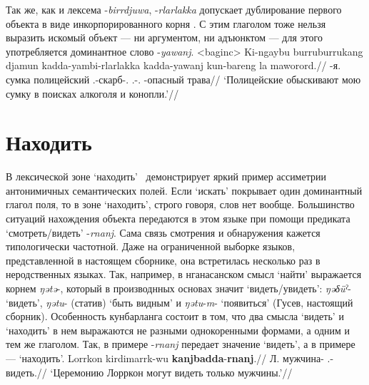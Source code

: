 Так же, как и лексема -\textit{birrdjuwa}, -\textit{rlarlakka} допускает дублирование первого объекта в виде инкорпорированного корня . С этим глаголом тоже нельзя выразить искомый объект --- ни аргументом, ни адъюнктом --- для этого употребляется доминантное слово -\textit{yawanj}.
\ex<baginc>\begingl
\gla Ki-ngaybu burruburrukang djamun kadda-yambi-rlarlakka kadda-yawanj kun-bareng la maworord.//
\glb \ki-я.\Gen{} сумка полицейский \Tpl.\Real-скарб-\rlk.\Np{} \Tpl.\Real-\yaw.\Np{} \Cliv-опасный \la{} трава//
\glft `Полицейские обыскивают мою сумку в поисках алкоголя и конопли.'//%
\endgl\xe


\section{Находить}
\label{sec:find}
В лексической зоне `находить' \ демонстрирует яркий пример ассиметрии антонимичных семантических полей. Если `искать' покрывает один доминантный глагол поля, то в зоне `находить', строго говоря, слов нет вообще. Большинство ситуаций нахождения объекта передаются в этом языке при помощи предиката `смотреть/видеть' -\textit{rnanj}. Сама связь смотрения и обнаружения кажется типологически частотной. Даже на ограниченной выборке языков, представленной в настоящем сборнике, она встретилась несколько раз в неродственных языках. Так, например, в нганасанском смысл `найти' выражается корнем \textit{ŋətə}-, который в производнных основах значит `видеть/увидеть': \textit{ŋəδüˀ}- `видеть', \textit{ŋətu}- (статив) `быть видным' и \textit{ŋətu}-\textit{m}- `появиться' (Гусев, настоящий сборник). Особенность кунбарланга состоит в том, что два смысла `видеть' и `находить' в нем выражаются не разными однокоренными формами, а одним и тем же глаголом. Так, в примере  -\textit{rnanj} передает значение `видеть', а в примере  --- `находить'.
\begingl
\gla Lorrkon kirdimarrk-wu \textbf{kanjbadda}-\textbf{rnanj}.//
\glb Л. мужчина-\Lim{} \Tpl.\Fut-видеть.\Np{}//
\glft `Церемонию Лорркон могут видеть только мужчины.'//%
\endgl\xe

